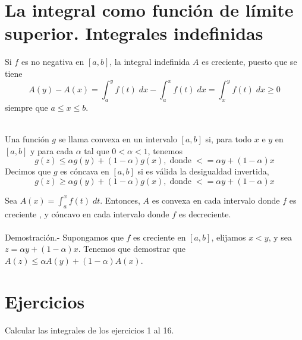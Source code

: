 \section{La integral como función de límite superior. Integrales indefinidas}

Si $f$ es no negativa en $[a,b]$, la integral indefinida $A$ es creciente, puesto que se tiene
$$A(y)-A(x)=\int_a^y f(t)\; dx - \int_a^x f(t)\; dx = \int_x^y f(t)\; dx \geq 0$$
siempre que $a\leq x \leq b.$\\\\

\begin{tcolorbox}
    \begin{def.} Una función $g$ se llama convexa en un intervalo $[a,b]$ si, para todo $x$ e $y$ en $[a,b]$ y para cada $\alpha$ tal que $0<\alpha<1$, tenemos 
	$$g(z)\leq \alpha g(y) + (1-\alpha)g(x),\; \mbox{donde}\; <=\alpha y + (1-\alpha)x$$
	Decimos que $g$ es cóncava en $[a,b]$ si es válida la desigualdad invertida,
	$$g(z)\geq \alpha g(y) + (1-\alpha)g(x),\; \mbox{donde}\; <=\alpha y + (1-\alpha)x$$
    \end{def.}
\end{tcolorbox}

\begin{teo}
    Sea $A(x) =\int_a^x f(t)\; dt$. Entonces, $A$ es convexa en cada intervalo donde $f$ es creciente , y cóncavo en cada intervalo donde $f$ es decreciente.\\\\
    Demostración.-\; Supongamos que $f$ es creciente en $[a,b]$, elijamos $x<y$,  y sea $z=\alpha y + (1-\alpha)x.$ Tenemos que demostrar que $A(z)\leq \alpha A(y)+(1-\alpha)A(x)$. 
\end{teo}




\section{Ejercicios}

Calcular las integrales de los ejercicios 1 al 16.\\\\

